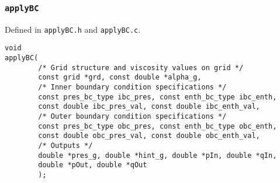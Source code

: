 \documentclass[12pt]{article}
\begin{document}
\subsubsection{\texttt{applyBC}}
\label{sssec:applyBC}

Defined in \texttt{applyBC.h} and \texttt{applyBC.c}.

\begin{verbatim}
void 
applyBC(
        /* Grid structure and viscosity values on grid */
        const grid *grd, const double *alpha_g,
        /* Inner boundary condition specifications */
        const pres_bc_type ibc_pres, const enth_bc_type ibc_enth,
        const double ibc_pres_val, const double ibc_enth_val,
        /* Outer boundary condition specifications */
        const pres_bc_type obc_pres, const enth_bc_type obc_enth,
        const double obc_pres_val, const double obc_enth_val,
        /* Outputs */
        double *pres_g, double *hint_g, double *pIn, double *qIn, 
        double *pOut, double *qOut
        );
\end{verbatim}
\end{document}
